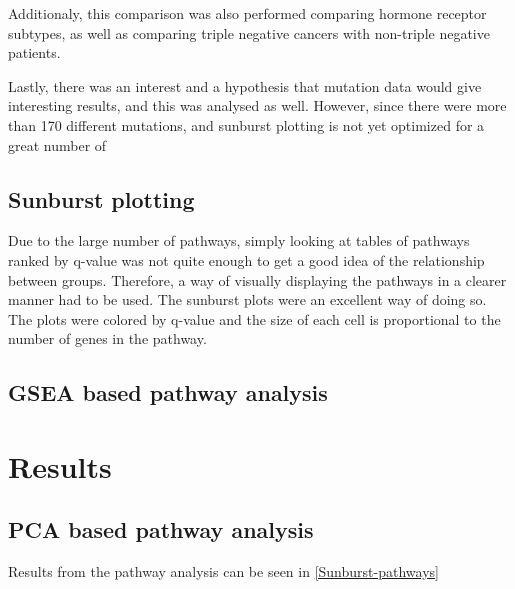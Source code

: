 \documentclass{kththesis}
\begin{document}
     Additionaly, this comparison was also performed comparing hormone receptor subtypes, as well as comparing triple negative cancers with non-triple negative patients.

     Lastly, there was an interest and a hypothesis that mutation data would give interesting results, and this was analysed as well. However, since there were more than 170 different mutations, and sunburst plotting is not yet optimized for a great number of

     \section{Sunburst plotting}
     Due to the large number of pathways, simply looking at tables of pathways ranked by q-value was not quite enough to get a good idea of the relationship between groups. Therefore, a way of visually displaying the pathways in a clearer manner had to be used. The sunburst plots were an excellent way of doing so. The plots were colored by q-value and the size of each cell is proportional to the number of genes in the pathway.



     \section{GSEA based pathway analysis}





\chapter{Results}

     \section{PCA based pathway analysis}
     Results from the pathway analysis can be seen in \ref{Sunburst-pathways}
\end{document}
